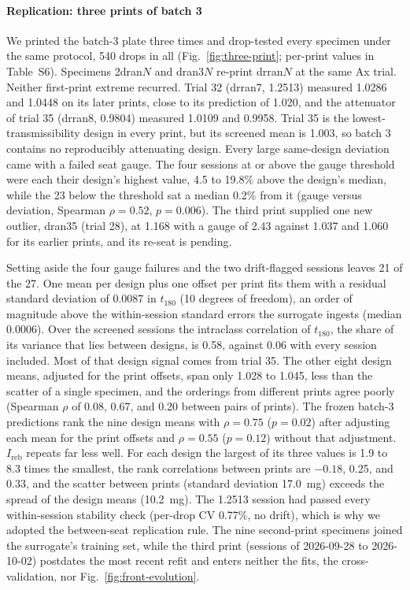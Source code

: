 \documentclass[11pt]{article}
\begin{document}
\paragraph{Replication: three prints of batch 3} We printed the batch-3
plate three times and drop-tested every specimen under the same protocol,
540 drops in all (Fig.~\ref{fig:three-print}; per-print values in
Table~S6). Specimens 2dran$N$ and
dran3$N$ re-print drran$N$ at the same Ax trial. Neither first-print
extreme recurred. Trial 32 (drran7, 1.2513) measured 1.0286 and 1.0448
on its later prints, close to its prediction of 1.020, and the
attenuator of trial 35 (drran8, 0.9804) measured 1.0109 and 0.9958.
Trial 35 is the lowest-transmissibility design in every print, but its
screened mean is 1.003, so batch 3 contains no reproducibly attenuating
design. Every large same-design deviation came with a failed seat gauge.
The four sessions at or above the gauge threshold were each their design's highest
value, 4.5 to 19.8\% above the design's median, while the 23 below the
threshold sat a median 0.2\% from it (gauge versus deviation, Spearman
$\rho = 0.52$, $p = 0.006$). The third print supplied one new outlier,
dran35 (trial 28), at 1.168 with a gauge of 2.43 against 1.037 and 1.060
for its earlier prints, and its re-seat is pending.

Setting aside the four gauge failures and the two drift-flagged
sessions leaves 21 of the 27. One mean per design plus one offset per
print fits them with a residual standard deviation of 0.0087 in
$t_{180}$ (10 degrees of freedom), an order of magnitude above the
within-session standard errors the surrogate ingests (median 0.0006).
Over the screened sessions the intraclass correlation of $t_{180}$, the
share of its variance that lies between designs, is 0.58, against 0.06
with every session included. Most of that design signal comes from trial
35. The other eight design means, adjusted for the print offsets, span
only 1.028 to 1.045, less than the scatter of a single specimen, and the
orderings from different prints
agree poorly (Spearman $\rho$ of 0.08, 0.67, and 0.20 between pairs of
prints). The frozen batch-3 predictions rank the nine design means with
$\rho = 0.75$ ($p = 0.02$) after adjusting each mean for the print
offsets and $\rho = 0.55$ ($p = 0.12$) without that adjustment.
$I_{\mathrm{reb}}$ repeats far less well. For each design the largest of
its three values is 1.9 to 8.3 times the smallest, the rank correlations
between prints are $-0.18$, 0.25, and 0.33, and the scatter between
prints (standard deviation \SI{17.0}{mg}) exceeds the spread of the
design means (\SI{10.2}{mg}). The 1.2513 session had passed every
within-session stability check (per-drop CV 0.77\%, no drift), which is
why we adopted the between-seat replication rule. The nine second-print
specimens joined the surrogate's training set, while the third print
(sessions of 2026-09-28 to 2026-10-02) postdates the most recent refit
and enters neither the fits, the cross-validation, nor
Fig.~\ref{fig:front-evolution}.
\end{document}
